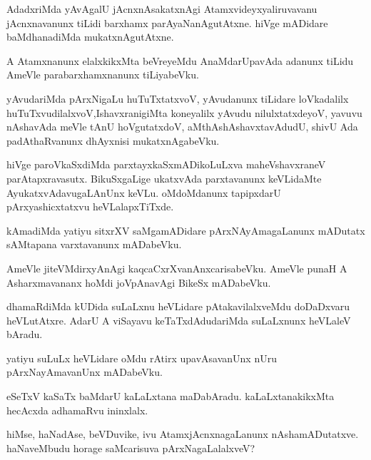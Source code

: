 \documentclass{article}
\begin{document}
\begin{mn}
AdadxriMda yAvAgalU jAcnxnAsakatxnAgi Atamxvideyxyaliruvavanu jAcnxnavanunx tiLidi barxhamx 
parAyaNanAgutAtxne. hiVge mADidare baMdhanadiMda mukatxnAgutAtxne.
\end{mn}

\begin{mn}
A Atamxnanunx elalxkikxMta beVreyeMdu AnaMdarUpavAda adanunx tiLidu AmeVle parabarxhamxnanunx 
tiLiyabeVku.
\end{mn}

\begin{mn}
yAvudariMda pArxNigaLu huTuTxtatxvoV, yAvudanunx tiLidare loVkadalilx  
huTuTxvudilalxvoV,IshavxranigiMta koneyalilx yAvudu nilulxtatxdeyoV, yavuvu nAshavAda meVle tAnU 
hoVgutatxdoV, aMthAshAshavxtavAdudU, shivU Ada padAthaRvanunx dhAyxnisi mukatxnAgabeVku.
\end{mn}

\begin{mn}
hiVge paroVkaSxdiMda parxtayxkaSxmADikoLuLxva maheVshavxraneV parAtapxravasutx. BikuSxgaLige 
ukatxvAda parxtavanunx keVLidaMte AyukatxvAdavugaLAnUnx keVLu. oMdoMdanunx tapipxdarU 
pArxyashicxtatxvu heVLalapxTiTxde.
\end{mn}

\begin{mn}
kAmadiMda yatiyu sitxrXV saMgamADidare pArxNAyAmagaLanunx mADutatx sAMtapana varxtavanunx mADabeVku.
\end{mn}

\begin{mn}
AmeVle jiteVMdirxyAnAgi kaqcaCxrXvanAnxcarisabeVku. AmeVle punaH A Asharxmavananx hoMdi 
joVpAnavAgi BikeSx mADabeVku. 
\end{mn}

\begin{mn}
dhamaRdiMda kUDida suLaLxnu heVLidare pAtakavilalxveMdu doDaDxvaru heVLutAtxre. AdarU A viSayavu 
keTaTxdAdudariMda suLaLxnunx heVLaleV bAradu.
\end{mn}

\begin{mn}
yatiyu suLuLx heVLidare oMdu rAtirx upavAsavanUnx nUru pArxNayAmavanUnx mADabeVku.
\end{mn}

\begin{mn}
eSeTxV kaSaTx baMdarU kaLaLxtana maDabAradu. kaLaLxtanakikxMta hecAcxda adhamaRvu ininxlalx.
\end{mn}

\begin{mn}
hiMse, haNadAse, beVDuvike, ivu AtamxjAcnxnagaLanunx nAshamADutatxve. haNaveMbudu horage 
saMcarisuva pArxNagaLalalxveV?
\end{mn}
\end{document}
